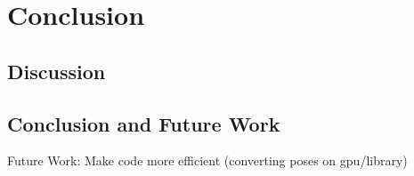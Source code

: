 \chapter{Conclusion}


\section{Discussion}

\section{Conclusion and Future Work}

Future Work: Make code more efficient (converting poses on gpu/library)